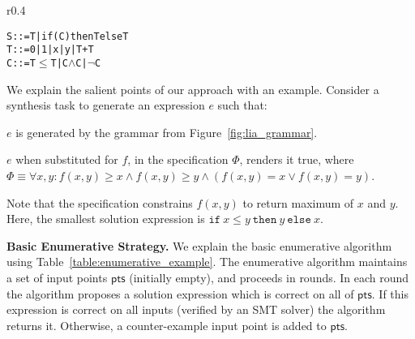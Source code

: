 \documentclass{llncs}
\newcommand\Points{\mathsf{pts}}
\newcommand\Expr{e}
\newcommand\Spec{\Phi}
\newcommand\SynthFun{f}
\newcommand\ITE[3]{\mathtt{if}~#1~\mathtt{then}~#2~\mathtt{else}~#3}
\renewcommand{\paragraph}[1]{\par\noindent\textbf{#1.}}
\begin{document}
\begin{wrapfigure}{r}{0.4\textwidth}
  \vspace*{-3ex}
  \begin{alltt}
  \fontsize{8}{10}\selectfont
S ::= T | if (C) then T else T
T ::= 0 | 1 | x | y | T + T
C ::= T \(\leq\) T | C \(\wedge\) C | \(\neg\) C
\end{alltt}
  \vspace*{-2ex}
  \caption{Grammar for linear integer expressions}
  \label{fig:lia_grammar}
  \vspace*{-1ex}
\end{wrapfigure}
We explain the salient points of our approach with an example.
Consider a synthesis task to generate an expression $\Expr$ such that:
\begin{inparaenum}[(a)]
\item $\Expr$ is generated by the grammar from Figure~\ref{fig:lia_grammar}.
\item $\Expr$ when substituted for $f$, in the specification
  $\Spec$, renders it true, where $\Spec \equiv \forall x, y :
  \SynthFun(x, y) \geq x \wedge \SynthFun(x, y) \geq y \wedge
  (\SynthFun(x,y) = x \vee \SynthFun(x,y) = y)$.
\end{inparaenum}
Note that the specification constrains $\SynthFun(x, y)$ to return
maximum of $x$ and $y$.
Here, the smallest solution expression is $\ITE{x \leq y}{y}{x}$.

\paragraph{Basic Enumerative Strategy}
We explain the basic enumerative
algorithm~\cite{udupa-transit} using
Table~\ref{table:enumerative_example}.
The enumerative algorithm maintains a set of input points
$\Points$ (initially empty), and proceeds in rounds.
In each round the algorithm proposes a solution expression which
is correct on all of $\Points$.
If this expression is correct on all inputs (verified by an SMT
solver) the algorithm returns it.
Otherwise, a counter-example input point is added to $\Points$.
\end{document}
